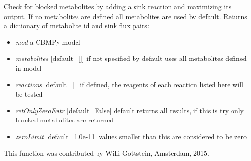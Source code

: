 \documentclass[a4paper,11pt,english]{sphinxmanual}
\begin{document}
\begin{fulllineitems}
\label{modules_doc:cbmpy.CBTools.checkProducibilityMetabolites}
Check for blocked metabolites by adding a sink reaction and maximizing its output. If no metabolites
are defined all metabolites are used by default. Returns a dictionary of metabolite
id and sink flux pairs:
\begin{itemize}
\item {} 
\emph{mod} a CBMPy model

\item {} 
\emph{metabolites} {[}default={[}{]}{]} if not specified by default uses all metabolites defined in model

\item {} 
\emph{reactions} {[}default={[}{]}{]} if defined, the reagents of each reaction listed here will be tested

\item {} 
\emph{retOnlyZeroEntr} {[}default=False{]} default returns all results, if this is try only blocked metabolites are returned

\item {} 
\emph{zeroLimit} {[}default=1.0e-11{]} values smaller than this are considered to be zero

\end{itemize}

This function was contributed by Willi Gottstein, Amsterdam, 2015.

\end{fulllineitems}

\end{document}
